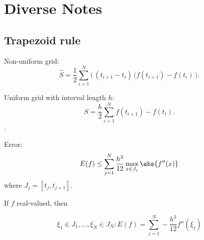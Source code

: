 \section{Diverse Notes}

\subsection{Trapezoid rule} 
Non-uniform grid:
\[ \hat S = \frac{1}{2} \sum_{i=1}^N \bigl(\,(t_{i+1} - t_i) \,(f(t_{i+1}) - f(t_i)\, \bigr).\]

Uniform grid with interval length $h$:
\[ \hat S = \frac{h}{2} \sum_{i=1}^N  f(t_{i+1}) - f(t_i).\].

Error:
\[E(f) \leq \sum_{j=1}^N \frac{h^3}{12} \max_{x \in J_j} \abs{f''(x)}\]
where $J_j = [t_j,t_{j+1}]$.

If $f$ real-valued, then 

\[ \xi_1 \in J_1,...,\xi_N \in J_N: E(f) = \sum_{j=1}^N - \frac{h^3}{12} f''(\xi_j) \] 

